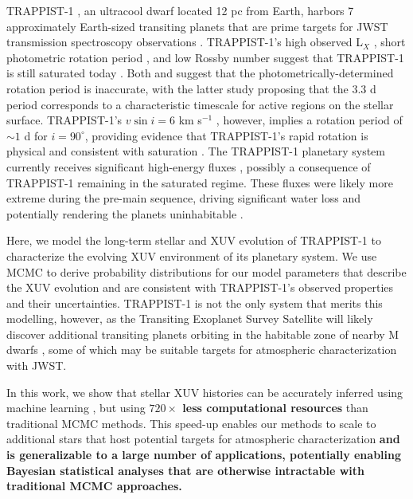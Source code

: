 \documentclass[twocolumn]{aastex62}
\def\lsim{~\rlap{$<$}{\lower 1.0ex\hbox{$\sim$}}}
\newcommand{\xxx}[1]{{\textbf{#1}}}
\newcommand{\approxposterior}[0]{\texttt{approxposterior}\xspace}
\begin{document}
TRAPPIST-1 \citep{Gillon2016,Gillon2017}, an ultracool dwarf located 12 pc from Earth, harbors 7 approximately Earth-sized transiting planets that are prime targets for JWST transmission spectroscopy observations \citep{Morley2017,Lincowski2018,Lustig2019}. TRAPPIST-1's high observed L$_{X}$ \citep{Wheatley2017}, short photometric rotation period \citep[3.3 d, ][]{Luger2017}, and low Rossby number \citep[Ro $\approx 0.01$, ][]{Roettenbacher2017} suggest that TRAPPIST-1 is still saturated today \citep{Pizzolato2003,Wright2011,Wright2018}. Both \citet{Roettenbacher2017} and \citet{Morris2018} suggest that the photometrically-determined rotation period is inaccurate, with the latter study proposing that the 3.3 d period corresponds to a characteristic timescale for active regions on the stellar surface. TRAPPIST-1's $v \sin i = 6$ km s$^{-1}$ \citep{Barnes2014}, however, implies a rotation period of ${\sim}1$ d for $i = 90^{\circ}$, providing evidence that TRAPPIST-1's rapid rotation is physical and consistent with saturation \citep[$P_{rot} \lsim 20$ d,][]{Wright2018}. The TRAPPIST-1 planetary system currently receives significant high-energy fluxes \citep{Bourrier2017b,Wheatley2017,Peacock2019}, possibly a consequence of TRAPPIST-1 remaining in the saturated regime. These fluxes were likely more extreme during the pre-main sequence, driving significant water loss and potentially rendering the planets uninhabitable \citep{Bolmont2017,Bourrier2017a}. 

Here, we model the long-term stellar and XUV evolution of TRAPPIST-1 to characterize the evolving XUV environment of its planetary system. We use MCMC to derive probability distributions for our model parameters that describe the XUV evolution and are consistent with TRAPPIST-1's observed properties and their uncertainties. TRAPPIST-1 is not the only system that merits this modelling, however, as the Transiting Exoplanet Survey Satellite will likely discover additional transiting planets orbiting in the habitable zone of nearby M dwarfs \citep{Barclay2018}, some of which may be suitable targets for atmospheric characterization with JWST. 

In this work, we show that stellar XUV histories can be accurately inferred using machine learning \citep[\approxposterior, ][]{FlemingVanderPlas2018}, but using \xxx{$720\times$ less computational resources} than traditional MCMC methods. This speed-up enables our methods to scale to additional stars that host potential targets for atmospheric characterization \xxx{and is generalizable to a large number of applications, potentially enabling Bayesian statistical analyses that are otherwise intractable with traditional MCMC approaches.}
\end{document}

